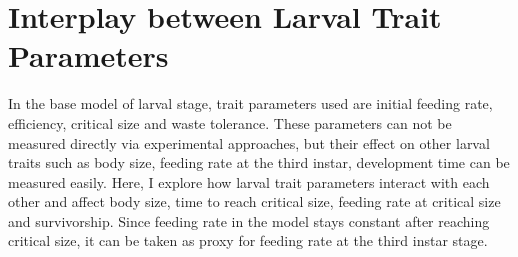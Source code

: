 \chapter{Interplay between Larval Trait Parameters}
In the base model of larval stage, trait parameters used are initial feeding rate, efficiency, critical size and waste tolerance. These parameters can not be measured directly via experimental approaches, but their effect on other larval traits such as body size, feeding rate at the third instar, development time can be measured easily. Here, I explore how larval trait parameters interact with each other and affect body size, time to reach critical size, feeding rate at critical size and survivorship. Since feeding rate in the model stays constant after reaching critical size, it can be taken as proxy for feeding rate at the third instar stage.

